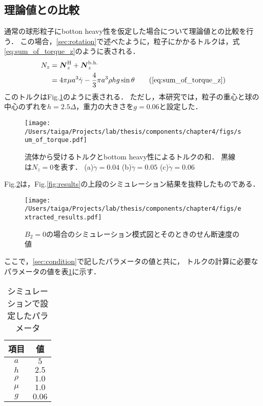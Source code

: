 \subsection{理論値との比較}
通常の球形粒子にbotton heavy性を仮定した場合について理論値との比較を行う．
この場合，\ref{sec:rotation}で述べたように，粒子にかかるトルクは，式\eqref{eq:sum_of_torque_z}のように表される．
    \begin{align}
        N_z &= \boldsymbol{N}^\mathrm{H}_z + \boldsymbol{N}^\mathrm{b.h.}_z \notag \\
            &= 4 \pi \mu a^3 \dot{\gamma} - \frac{4}{3} \pi a^3 \rho h g \sin \theta
        \tag{\ref{eq:sum_of_torque_z}}
    \end{align}
\noindent
このトルクはFig.\ref{fig:sum_of_torque}のように表される．
ただし，本研究では，粒子の重心と球の中心のずれを$h = 2.5 \Delta$，重力の大きさを$g = 0.06$と設定した．
    \begin{figure}[H]
        \centering
        \texttt{[image: /Users/taiga/Projects/lab/thesis/components/chapter4/figs/sum\_of\_torque.pdf]}
        \caption{流体から受けるトルクとbottom heavy性によるトルクの和．
        黒線は$N_z = 0$を表す．
        (a)$\dot{\gamma} = 0.04$
        (b)$\dot{\gamma} = 0.05$
        (c)$\dot{\gamma} = 0.06$}
        \label{fig:sum_of_torque}
    \end{figure}
\noindent
Fig.\ref{fig:extracted_results}は，Fig.\ref{fig:results}の上段のシミュレーション結果を抜粋したものである．
    \begin{figure}[H]
        \centering
        \texttt{[image: /Users/taiga/Projects/lab/thesis/components/chapter4/figs/extracted\_results.pdf]}
        \caption{$B_2 = 0$の場合のシミュレーション模式図とそのときのせん断速度の値}
        \label{fig:extracted_results}
    \end{figure}
\noindent
ここで，\ref{sec:condition}で記したパラメータの値と共に，
トルクの計算に必要なパラメータの値を表\ref{tab:parameters}に示す．
    \begin{table}[H]
        \centering
        \caption{シミュレーションで設定したパラメータ}
        \label{tab:parameters}
        \begin{tabular}{cc}
            \hline
            項目 & 値 \\
            \hline
            $a$    & $5$ \\
            $h$    & $2.5$ \\
            $\rho$ & $1.0$ \\
            $\mu$  & $1.0$ \\
            $g$    & $0.06$ \\
            \hline
        \end{tabular}
    \end{table}
